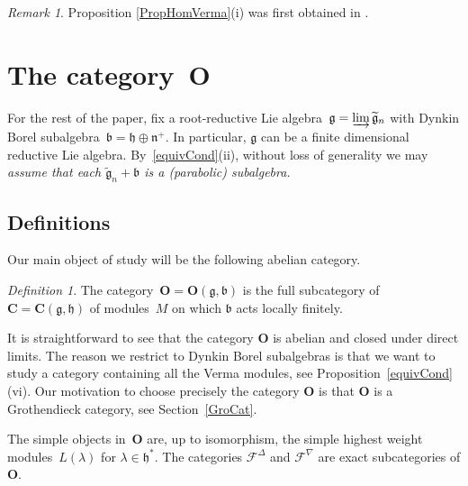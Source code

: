 \documentclass[11pt]{amsart}
\newcommand{\cF}{{\mathcal{F}}}
\newcommand{\bO}{\mathbf{O}}
\newcommand{\bC}{\mathbf{C}}
\newcommand{\fn}{\mathfrak{n}}
\newcommand{\fg}{\mathfrak{g}}
\newcommand{\fh}{\mathfrak{h}}
\newcommand{\fb}{\mathfrak{b}}
\numberwithin{equation}{section}
\theoremstyle{plain}
\newtheorem{lemma}[subsubsection]{Lemma}
\theoremstyle{remark}
\newtheorem{rem}[subsubsection]{Remark}
\newtheorem{ddef}[subsubsection]{Definition}
\theoremstyle{remark}
\theoremstyle{construction}
\begin{document}
\begin{rem}
Proposition \ref{PropHomVerma}(i) was first obtained in \cite[Section~6.4]{NamT}.
\end{rem}



  

\section{The category~$\bO$}\label{Sec4}
For the rest of the paper, fix a root-reductive Lie algebra~$\fg=\varinjlim\widetilde{\fg}_n$ with Dynkin Borel subalgebra~$\fb=\fh\oplus\fn^+$. In particular, $\fg$ can be a finite dimensional reductive Lie algebra. By~\ref{equivCond}(ii), without loss of generality we may {\em assume that each $\widetilde{\fg}_n+\fb$ is a (parabolic) subalgebra.}





\subsection{Definitions}
{Our} main object of study will be the following abelian category.
\begin{ddef}\label{DefO}
The category~$\bO=\bO(\fg,\fb)$ is the full subcategory of~$\bC=\bC(\fg,\fh)$ of modules~$M$ on which $\fb$ acts locally finitely.
\end{ddef}
It is straightforward to see that {the category} $\bO$ is abelian and closed under direct limits. The reason we restrict to Dynkin Borel subalgebras  {is} that we want  {to study a} category   {containing all} the Verma modules, see Proposition~\ref{equivCond}(vi). Our motivation to  {choose precisely the category} $\bO$  {is} that $\bO$ is a Grothendieck category, see Section~\ref{GroCat}.



The simple objects in~$\bO$ are, up to isomorphism,  the simple highest weight modules~$L(\lambda)$ for $\lambda\in\fh^\ast$.
The categories $\cF^\Delta$ and $\cF^\nabla$ are exact subcategories of $\bO$.




\end{document}
